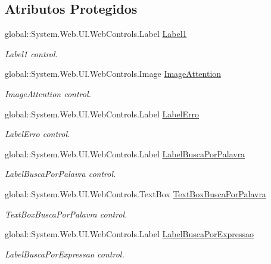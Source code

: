 \subsection*{Atributos Protegidos}
\begin{DoxyCompactItemize}
\item 
global::System.Web.UI.WebControls.Label \hyperlink{class_sistema_r_h_1_1_busca_a7cb1087d5d1300385bedcae52bfb289b}{Label1}
\begin{DoxyCompactList}\small\item\em Label1 control. \item\end{DoxyCompactList}\item 
global::System.Web.UI.WebControls.Image \hyperlink{class_sistema_r_h_1_1_busca_a44820908a1c287b97dec8206ce9a1c42}{ImageAttention}
\begin{DoxyCompactList}\small\item\em ImageAttention control. \item\end{DoxyCompactList}\item 
global::System.Web.UI.WebControls.Label \hyperlink{class_sistema_r_h_1_1_busca_a535cca174a161b66a326757ba473f202}{LabelErro}
\begin{DoxyCompactList}\small\item\em LabelErro control. \item\end{DoxyCompactList}\item 
global::System.Web.UI.WebControls.Label \hyperlink{class_sistema_r_h_1_1_busca_a7081dc004d6d73d3fb4faa50620918ac}{LabelBuscaPorPalavra}
\begin{DoxyCompactList}\small\item\em LabelBuscaPorPalavra control. \item\end{DoxyCompactList}\item 
global::System.Web.UI.WebControls.TextBox \hyperlink{class_sistema_r_h_1_1_busca_a9cca7f526f1fa4264ab29f4588746555}{TextBoxBuscaPorPalavra}
\begin{DoxyCompactList}\small\item\em TextBoxBuscaPorPalavra control. \item\end{DoxyCompactList}\item 
global::System.Web.UI.WebControls.Label \hyperlink{class_sistema_r_h_1_1_busca_a867cb379b40334a7a0f8807eb420cc14}{LabelBuscaPorExpressao}
\begin{DoxyCompactList}\small\item\em LabelBuscaPorExpressao control. \item\end{DoxyCompactList}\item 

\end{DoxyCompactItemize}
